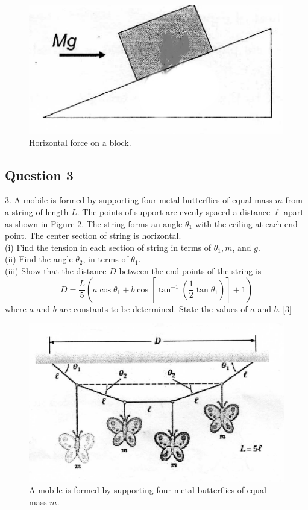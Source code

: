 \documentclass{article}
\begin{document}
\begin{figure}
\centering
\includegraphics[width=0.5 \linewidth]{spho_book_TYS_images/2010q2.png}
\caption{Horizontal force on a block.} \label{2010q2}
\end{figure}


\subsection{Question 3}
3. A mobile is formed by supporting four metal butterflies of equal mass $m$ from a string of length $L$. The points of support are evenly spaced a distance $\ell$ apart as shown in Figure \ref{2010q3}. The string forms an angle $\theta_{1}$ with the ceiling at each end point. The center section of string is horizontal. \\
(i) Find the tension in each section of string in terms of $\theta_{1}, m$, and $g$. \\
(ii) Find the angle $\theta_{2}$, in terms of $\theta_{1}$. \\
(iii) Show that the distance $D$ between the end points of the string is
$$
D=\frac{L}{5}\left(a \cos \theta_{1}+b \cos \left[\tan ^{-1}\left(\frac{1}{2} \tan \theta_{1}\right)\right]+1\right)
$$
where $a$ and $b$ are constants to be determined. State the values of $a$ and $b$. [3] \\

\begin{figure}
\centering
\includegraphics[width=\linewidth]{spho_book_TYS_images/2010q3.png}
\caption{A mobile is formed by supporting four metal butterflies of equal mass $m$.} \label{2010q3}
\end{figure}
\end{document}
